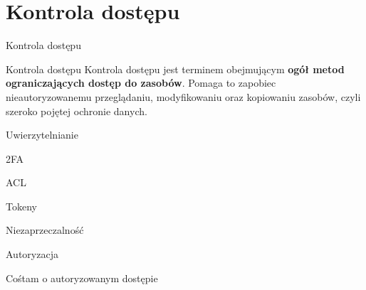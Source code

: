\section{Kontrola dostępu}

\begin{frame}{Kontrola dostępu}
		\begin{alertblock}{Kontrola dostępu}
			Kontrola dostępu jest terminem obejmującym \textbf{ogół metod ograniczających dostęp do zasobów}.
			Pomaga to zapobiec nieautoryzowanemu przeglądaniu, modyfikowaniu oraz kopiowaniu zasobów, czyli szeroko pojętej ochronie danych. 
		\end{alertblock}		
\end{frame}


\begin{frame}{Uwierzytelnianie}

\end{frame}

\begin{frame}{2FA}
	
\end{frame}

\begin{frame}{ACL}
	
\end{frame}

\begin{frame}{Tokeny}
	
\end{frame}

\begin{frame}{Niezaprzeczalność}
	
\end{frame}

\begin{frame}{Autoryzacja}
	
\end{frame}

\begin{frame}{Cośtam o autoryzowanym dostępie}
	
\end{frame}


